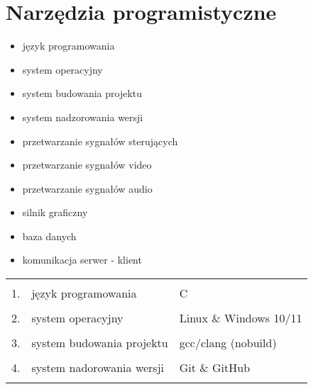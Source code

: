 \section{Narzędzia programistyczne}


\begin{itemize}
  \item język programowania
  \item system operacyjny
  \item system budowania projektu
  \item system nadzorowania wersji
  \item przetwarzanie sygnałów sterujących
  \item przetwarzanie sygnałów video
  \item przetwarzanie sygnałów audio
  \item silnik graficzny
  \item baza danych
  \item komunikacja serwer - klient
\end{itemize}

\begin{tabular}{|r|l|l|}
\hline \\
  1. & język programowania & C \\
\hline \\
  2. & system operacyjny & Linux \& Windows 10/11 \\
\hline \\
  3. & system budowania projektu & gcc/clang (nobuild) \\
\hline \\
  4. & system nadorowania wersji & Git \& GitHub \\
\hline \\
\end{tabular}
